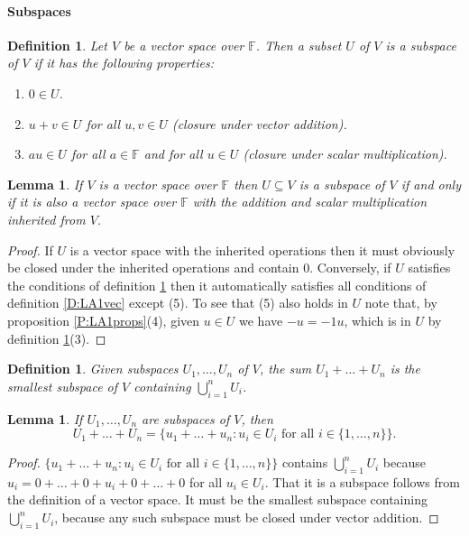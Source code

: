 \documentclass{article}
\theoremstyle{plain}
\newtheorem{definition}[theorem]{Definition}{\bfseries}{\upshape}
\newtheorem{lemma}[theorem]{Lemma}{\bfseries}{\upshape}
\newcommand{\bF}{\mathbb{F}}
\begin{document}
\paragraph{Subspaces}

\begin{definition}\label{D:LA1subs}
Let $V$ be a vector space over $\bF$. Then a subset $U$ of $V$ is a \emph{subspace} of $V$ if it has the following properties:
\begin{enumerate}
\item $0\in U$.
\item $u + v \in U$ for all $u,v\in U$ (closure under vector addition). 
\item $au\in U$ for all $a\in \bF$ and for all $u\in U$ (closure under scalar multiplication).
\end{enumerate}
\end{definition}

\begin{lemma}
If $V$ is a vector space over $\bF$ then $U\subseteq V$ is a subspace of $V$ if and only if it is also a vector space over $\bF$ with the addition and scalar multiplication inherited from $V$.
\end{lemma}
\begin{proof}
If $U$ is a vector space with the inherited operations then it must obviously be closed under the inherited operations and contain $0$. Conversely, if $U$ satisfies the conditions of definition \ref{D:LA1subs} then it automatically satisfies all conditions of definition \ref{D:LA1vec} except (5). To see that (5) also holds in $U$ note that, by proposition \ref{P:LA1props}(4), given $u\in U$ we have $-u = -1u$, which is in $U$ by definition \ref{D:LA1subs}(3).
\end{proof}

\begin{definition}
Given subspaces $U_1,\ldots,U_n$ of $V$, the \emph{sum} $U_1+\ldots +U_n$ is the smallest subspace of $V$ containing $\bigcup_{i=1}^n U_i$.
\end{definition}

\begin{lemma}
If $U_1,\ldots,U_n$ are subspaces of $V$, then 
\[U_1+\ldots +U_n = \{u_1+\ldots +u_n: u_i\in U_i\text{ for all }i\in\{1,\ldots,n\}\}.\]
\end{lemma}
\begin{proof}
$\{u_1+\ldots +u_n: u_i\in U_i\text{ for all }i\in\{1,\ldots,n\}\}$ contains $\bigcup_{i=1}^n U_i$ because $u_i = 0+\ldots +0 + u_i + 0 +\ldots + 0$ for all $u_i\in U_i$. That it is a subspace follows from the definition of a vector space. It must be the smallest subspace containing $\bigcup_{i=1}^n U_i$, because any such subspace must be closed under vector addition. 
\end{proof}
\end{document}
